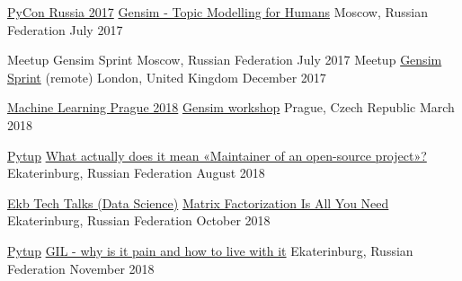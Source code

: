 

\begin{cventries}

  \cventry
    {\href{https://web.archive.org/web/20180810144052/http://pycon.ru/2017/en/}{PyCon Russia 2017}} %
    {\href{https://www.youtube.com/watch?v=TuJ_7OIxQWY}{Gensim - Topic Modelling for Humans}} %
    {Moscow, Russian Federation} %
    {July 2017} %
    {
    }

  \cventry
    {Meetup} %
    {Gensim Sprint} %
    {Moscow, Russian Federation} %
    {July 2017} %
    {
    }
  \cventry
    {Meetup} %
    {\href{https://www.meetup.com/ru-RU/Python-Sprints/events/245888885/}{Gensim Sprint}} %
    {(remote) London, United Kingdom} %
    {December 2017} %
    {
    }

  \cventry
    {\href{https://2018.mlprague.com/}{Machine Learning Prague 2018}} %
    {\href{https://github.com/RaRe-Technologies/talks/tree/master/2018-03-23_MLPrague-workshop}{Gensim workshop}} %
    {Prague, Czech Republic} %
    {March 2018} %
    {
    }

  \cventry
    {\href{https://events.yandex.ru/events/meetings/22-aug-2018/}{Pytup}} %
    {\href{https://slides.com/menshikh_iv/oss_maintaining_gensim}{What actually does it mean «Maintainer of an open-source project»?}} %
    {Ekaterinburg, Russian Federation} %
    {August 2018} %
    {
    }

  \cventry
    {\href{https://eventskbkontur.timepad.ru/event/834033/}{Ekb Tech Talks (Data Science)}}
    {\href{https://slides.com/menshikh_iv/gensim_kontur\#/}{Matrix Factorization Is All You Need}}
    {Ekaterinburg, Russian Federation}
    {October 2018}
    {
    }

  \cventry
    {\href{https://yandex.ru/pytup/}{Pytup}} %
    {\href{https://github.com/menshikh-iv/sum_seq_bench_pytup}{GIL - why is it pain and how to live with it}} %
    {Ekaterinburg, Russian Federation} %
    {November 2018} %
    {
    }


\end{cventries}
